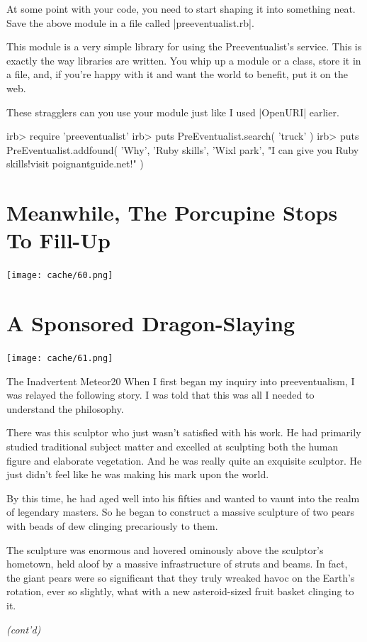 \documentclass[12pt,twoside]{report}
\begin{document}
At some point with your code, you need to start shaping it into
something neat.  Save the above module in a file called
\rubyinline|preeventualist.rb|.

This module is a very simple library for using the Preeventualist's
service.  This is exactly the way libraries are written.  You whip up
a module or a class, store it in a file, and, if you're happy with it
and want the world to benefit, put it on the web.

These stragglers can you use your module just like I used
\rubyinline|OpenURI| earlier.


\begin{consolecode}

 irb> require 'preeventualist'
 irb> puts PreEventualist.search( 'truck' )
 irb> puts PreEventualist.addfound( 'Why', 'Ruby skills', 'Wixl park',
        "I can give you Ruby skills!\nCome visit poignantguide.net!" )

\end{consolecode}



\section{Meanwhile, The Porcupine Stops To Fill-Up}


	\texttt{[image: cache/60.png]}


\section{A Sponsored Dragon-Slaying}


	\texttt{[image: cache/61.png]}

	\begin{sidebar}{The Inadvertent Meteor}{20}
		When I first began my inquiry into preeventualism, I was relayed the following story. I was told that this was all I needed to understand the philosophy.\vspace{6pt}
		
		There was this sculptor who just wasn't satisfied with his work. He had primarily studied traditional subject matter and excelled at sculpting both the human figure and elaborate vegetation. And he was really quite an exquisite sculptor. He just didn't feel like he was making his mark upon the world.\vspace{6pt}
		
		By this time, he had aged well into his fifties and wanted to vaunt into the realm of legendary masters. So he began to construct a massive sculpture of two pears with beads of dew clinging precariously to them.\vspace{6pt}
		
		The sculpture was enormous and hovered ominously above the sculptor's hometown, held aloof by a massive infrastructure of struts and beams. In fact, the giant pears were so significant that they truly wreaked havoc on the Earth's rotation, ever so slightly, what with a new asteroid-sized fruit basket clinging to it.\vspace{6pt}

		\textit{(cont'd)} \vspace{6pt}
	\end{sidebar}
\end{document}
